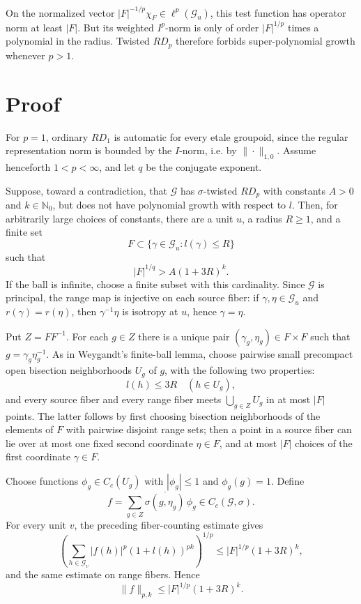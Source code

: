 \documentclass[11pt]{article}
\newcommand{\G}{\mathcal G}
\begin{document}
On the normalized vector \(|F|^{-1/p}\chi_F\in \ell^p(\G_u)\), this test
function has operator norm at least \(|F|\).  But its weighted \(I^p\)-norm is
only of order \(|F|^{1/p}\) times a polynomial in the radius.  Twisted \(RD_p\)
therefore forbids super-polynomial growth whenever \(p>1\).

\section*{Proof}

For \(p=1\), ordinary \(RD_1\) is automatic for every etale groupoid, since the
regular representation norm is bounded by the \(I\)-norm, i.e. by
\(\|\cdot\|_{1,0}\).  Assume henceforth \(1<p<\infty\), and let \(q\) be the
conjugate exponent.

Suppose, toward a contradiction, that \(\G\) has \(\sigma\)-twisted \(RD_p\)
with constants \(A>0\) and \(k\in\mathbb N_0\), but does not have polynomial
growth with respect to \(l\).  Then, for arbitrarily large choices of constants,
there are a unit \(u\), a radius \(R\ge 1\), and a finite set
\[
F\subset \{\gamma\in \G_u:l(\gamma)\le R\}
\]
such that
\[
|F|^{1/q}>A(1+3R)^k. \tag{1}
\]
If the ball is infinite, choose a finite subset with this cardinality.  Since
\(\G\) is principal, the range map is injective on each source fiber: if
\(\gamma,\eta\in\G_u\) and \(r(\gamma)=r(\eta)\), then
\(\gamma^{-1}\eta\) is isotropy at \(u\), hence \(\gamma=\eta\).

Put \(Z=FF^{-1}\).  For each \(g\in Z\) there is a unique pair
\((\gamma_g,\eta_g)\in F\times F\) such that \(g=\gamma_g\eta_g^{-1}\).  As in
Weygandt's finite-ball lemma, choose pairwise small precompact open bisection
neighborhoods \(U_g\) of \(g\), with the following two properties:
\[
l(h)\le 3R\quad(h\in U_g),
\]
and every source fiber and every range fiber meets \(\bigcup_{g\in Z}U_g\) in
at most \(|F|\) points.  The latter follows by first choosing bisection
neighborhoods of the elements of \(F\) with pairwise disjoint range sets; then a
point in a source fiber can lie over at most one fixed second coordinate
\(\eta\in F\), and at most \(|F|\) choices of the first coordinate
\(\gamma\in F\).

Choose functions \(\phi_g\in C_c(U_g)\) with \(|\phi_g|\le 1\) and
\(\phi_g(g)=1\).  Define
\[
f=\sum_{g\in Z}\overline{\sigma(g,\eta_g)}\,\phi_g\in C_c(\G,\sigma).
\]
For every unit \(v\), the preceding fiber-counting estimate gives
\[
\left(\sum_{h\in\G_v}|f(h)|^p(1+l(h))^{pk}\right)^{1/p}
\le |F|^{1/p}(1+3R)^k,
\]
and the same estimate on range fibers.  Hence
\[
\|f\|_{p,k}\le |F|^{1/p}(1+3R)^k. \tag{2}
\]
\end{document}
